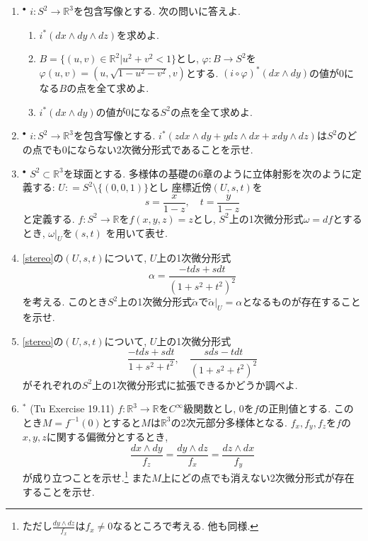 \documentclass[dvipdfmx,a4paper,11pt]{article}
\newcommand{\R}{\mathbb{R}}
\theoremstyle{definition}
\begin{document}
\begin{enumerate}[label=\textbf{問}\ref*{sec-mfd-diff}.\arabic*]
\item $^{\bullet}$ $i : S^2 \rightarrow \R^3$を包含写像とする. 次の問いに答えよ.
\begin{enumerate}
 \setlength{\parskip}{0cm}
  \setlength{\itemsep}{2pt} 
\item $i^{*}(dx \wedge dy \wedge dz)$を求めよ.
\item $B = \{ (u,v) \in \R^2 | u^2 + v^2 < 1\}$とし, $\varphi : B \to S^2$を$\varphi(u,v)= (u, \sqrt{1 - u^2 - v^2}, v)$とする. $(i \circ \varphi)^{*}(dx \wedge dy)$の値が0になる$B$の点を全て求めよ. 
\item $i^{*}(dx \wedge dy)$の値が0になる$S^2$の点を全て求めよ.
\end{enumerate}

\item $^{\bullet}$ $i : S^2 \rightarrow \R^3$を包含写像とする. $i^{*}( z dx \wedge dy  + y dz \wedge dx + x dy \wedge dz)$は$S^2$のどの点でも0にならない2次微分形式であることを示せ. 

\item \label{stereo} $^{\bullet}$ $S^2 \subset \R^3$を球面とする. 
多様体の基礎の6章のように立体射影を次のように定義する: $U : = S^2 \setminus \{ (0,0,1)\}$とし
座標近傍$(U, s, t)$を
$$
s = \frac{x}{1-z}, \quad t = \frac{y}{1-z}
$$
と定義する. 
$f : S^2 \to \R$を$f(x,y,z)=z$とし, $S^2$上の1次微分形式$\omega=df$とするとき, $\omega|_{U}$を$(s,t)$
を用いて表せ.

\item \ref{stereo}の$(U, s, t)$について, $U$上の1次微分形式
$$
\alpha = \frac{-t ds + s dt}{(1 + s^2 + t^2)^2}
$$
を考える. このとき$S^2$上の1次微分形式$\tilde{\alpha}$で$\tilde{\alpha}|_{U} = \alpha$となるものが存在することを示せ.

\item \ref{stereo}の$(U, s, t)$について, $U$上の1次微分形式
$$
\frac{-t ds + s dt}{1 + s^2 + t^2}, \quad{} \frac{s ds - t dt}{(1 + s^2 + t^2)^2}
$$
がそれぞれの$S^2$上の1次微分形式に拡張できるかどうか調べよ. 

\item $^{*}$ (Tu Exercise 19.11) $f : \R^3 \to\R$を$C^\infty$級関数とし, $0$を$f$の正則値とする.
このとき$M = f^{-1}(0)$とすると$M$は$\R^3$の2次元部分多様体となる.
$f_x, f_y, f_z$を$f$の$x,y,z$に関する偏微分とするとき,
$$
\frac{dx \wedge dy}{f_z} = \frac{dy \wedge dz}{f_x} = \frac{dz \wedge dx}{f_y}
$$
が成り立つことを示せ.\footnote{ただし$\frac{dy \wedge dz}{f_x} $は$f_x \neq 0$なるところで考える. 他も同様.} また$M$上にどの点でも消えない2次微分形式が存在することを示せ. 


\end{enumerate}
\end{document}

